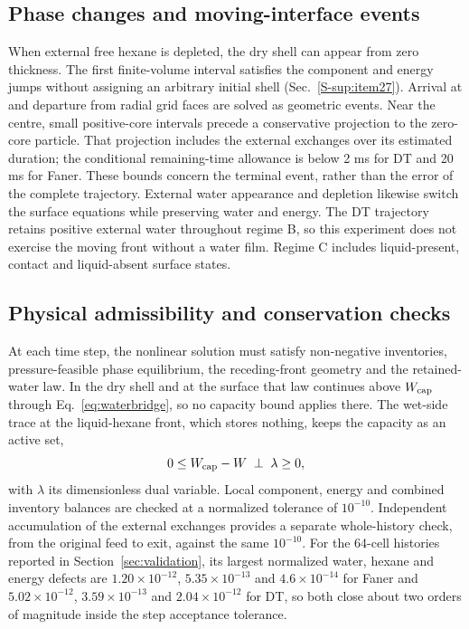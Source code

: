 \subsection{Phase changes and moving-interface events}
When external free hexane is depleted, the dry shell can appear from zero
thickness.
The first finite-volume interval satisfies the component and energy jumps
without assigning an arbitrary initial shell (Sec.~\ref*{S-sup:item27}). Arrival at and departure
from radial grid faces are solved as geometric events. Near the centre,
small positive-core intervals precede a conservative projection to the
zero-core particle. That projection includes the external exchanges over
its estimated duration; the conditional remaining-time allowance is below
2 ms for DT and 20 ms for Faner. These bounds concern the terminal event,
rather than the error of the complete trajectory.
External water appearance and depletion likewise switch the surface
equations while preserving water and energy. The DT
trajectory retains positive external water throughout regime B, so this
experiment does not exercise the moving front without a water film.
Regime C includes liquid-present, contact and liquid-absent surface states.

\subsection{Physical admissibility and conservation checks}
At each time step, the nonlinear solution must satisfy non-negative
inventories, pressure-feasible
phase equilibrium, the receding-front geometry and the retained-water
law. In the dry shell and at the surface that law continues above
$W_{\mathrm{cap}}$ through Eq.~\eqref{eq:waterbridge}, so no capacity bound applies
there. The wet-side trace at the liquid-hexane front, which stores nothing,
keeps the capacity as an active set,
\begin{equation}
0\le W_{\mathrm{cap}}-W\;\perp\;\lambda\ge0,
\label{eq:capcomplementarity}
\end{equation}
with $\lambda$ its dimensionless dual variable. Local component, energy and
combined inventory balances are checked at a normalized tolerance of
$10^{-10}$. Independent accumulation of the external exchanges provides
a separate whole-history check, from the original feed to exit, against
the same $10^{-10}$. For the 64-cell histories reported in
Section~\ref{sec:validation}, its largest normalized water, hexane and
energy defects are $1.20\times10^{-12}$, $5.35\times10^{-13}$ and
$4.6\times10^{-14}$ for Faner and $5.02\times10^{-12}$,
$3.59\times10^{-13}$ and $2.04\times10^{-12}$ for DT, so both close
about two orders of magnitude inside the step acceptance tolerance.

